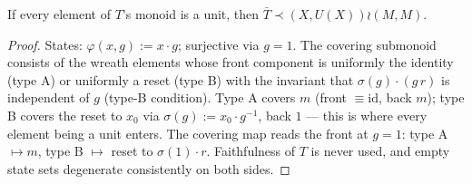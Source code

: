 \begin{lemma}[{[DKS] 2.11}]\label{lem:group-bar}
  \leanok
  If every element of $T$'s monoid is a unit, then
  $\bar T \prec (X, U(X)) \wr (M, M)$.
\end{lemma}
\begin{proof}
  \leanok
  States: $\varphi(x, g) := x \cdot g$; surjective via $g = 1$. The
  covering submonoid consists of the wreath elements whose front
  component is uniformly the identity (type A) or uniformly a reset
  (type B) with the invariant that $\sigma(g) \cdot (g\, r)$ is
  independent of $g$ (type-B condition). Type A covers $m$ (front
  $\equiv \mathrm{id}$, back $m$); type B covers the reset to $x_0$
  via $\sigma(g) := x_0 \cdot g^{-1}$, back $1$ --- this is where
  every element being a unit enters. The covering map reads the
  front at $g = 1$: type A $\mapsto m$, type B $\mapsto$ reset to
  $\sigma(1) \cdot r$. Faithfulness of $T$ is never used, and empty
  state sets degenerate consistently on both sides.
\end{proof}
